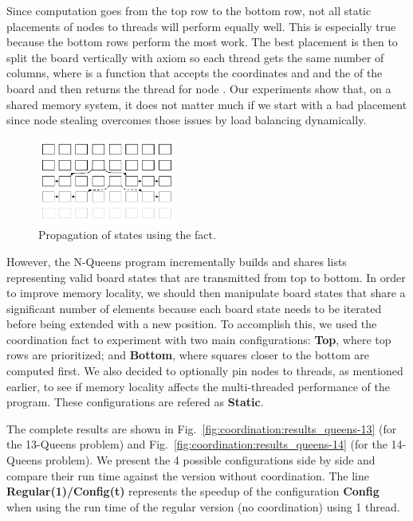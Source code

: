Since computation goes from the top row to the bottom row, not all static
placements of nodes to threads will perform equally well. This is especially
true because the bottom rows perform the most work.  The best placement is then
to split the board vertically with axiom  so each thread gets the same number of columns, where
 is a function that accepts the coordinates  and 
and the  of the board and then returns the thread for node .
Our experiments show that, on a shared memory system, it does not matter much if
we start with a bad placement since node stealing overcomes those issues by load
balancing dynamically.

\begin{figure}[ht!]
\includegraphics[width=0.4\textwidth]{figures/coordination/nqueens.pdf}
\caption{Propagation of states using the  fact.}
\label{coordination:fig:nqueens}
\end{figure}

However, the N-Queens program incrementally builds and shares lists representing
valid board states that are transmitted from top to bottom. In order to improve
memory locality, we should then manipulate board states that share a significant
number of elements because each board state needs to be iterated before being
extended with a new position. To accomplish this, we used the coordination fact
 to experiment with two main configurations:
\textbf{Top}, where top rows are prioritized; and \textbf{Bottom}, where squares
closer to the bottom are computed first. We also decided to optionally pin nodes
to threads, as mentioned earlier, to see if memory locality affects the
multi-threaded performance of the program. These configurations are refered as
\textbf{Static}.

The complete results are shown in
Fig.~\ref{fig:coordination:results_queens-13} (for the 13-Queens problem) and
Fig.~\ref{fig:coordination:results_queens-14} (for the 14-Queens problem). We
present the 4 possible configurations side by side and compare their run time
against the version without coordination. The line \textbf{Regular(1)/Config(t)}
represents the speedup of the configuration \textbf{Config} when using the run
time of the regular version (no coordination) using 1 thread.

